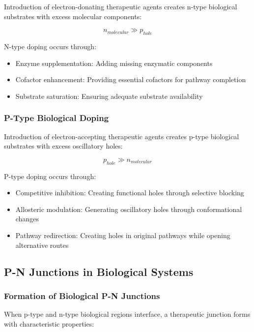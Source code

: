 \documentclass[12pt,a4paper]{article}
\begin{document}
Introduction of electron-donating therapeutic agents creates n-type biological substrates with excess molecular components:

\begin{equation}
n_{molecular} \gg p_{hole}
\end{equation}

N-type doping occurs through:
\begin{itemize}
\item Enzyme supplementation: Adding missing enzymatic components
\item Cofactor enhancement: Providing essential cofactors for pathway completion
\item Substrate saturation: Ensuring adequate substrate availability
\end{itemize}

\subsubsection{P-Type Biological Doping}

Introduction of electron-accepting therapeutic agents creates p-type biological substrates with excess oscillatory holes:

\begin{equation}
p_{hole} \gg n_{molecular}
\end{equation}

P-type doping occurs through:
\begin{itemize}
\item Competitive inhibition: Creating functional holes through selective blocking
\item Allosteric modulation: Generating oscillatory holes through conformational changes
\item Pathway redirection: Creating holes in original pathways while opening alternative routes
\end{itemize}

\subsection{P-N Junctions in Biological Systems}

\subsubsection{Formation of Biological P-N Junctions}

When p-type and n-type biological regions interface, a therapeutic junction forms with characteristic properties:
\end{document}
